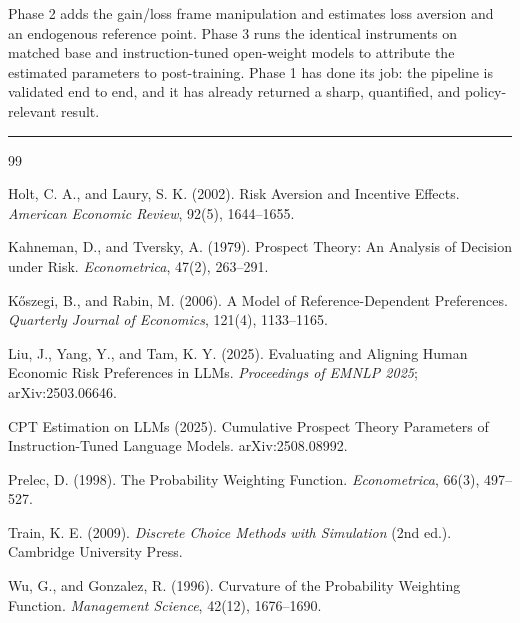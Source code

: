 \documentclass[11pt]{article}
\begin{document}
Phase 2 adds the gain/loss frame manipulation and estimates loss aversion and an endogenous reference
point. Phase 3 runs the identical instruments on matched base and instruction-tuned open-weight models
to attribute the estimated parameters to post-training. Phase 1 has done its job: the pipeline is
validated end to end, and it has already returned a sharp, quantified, and policy-relevant result.

\vspace{1em}
\hrule
\vspace{0.5em}

\begin{thebibliography}{99}
\small

Holt, C. A., and Laury, S. K. (2002).
Risk Aversion and Incentive Effects. \textit{American Economic Review}, 92(5), 1644--1655.

Kahneman, D., and Tversky, A. (1979).
Prospect Theory: An Analysis of Decision under Risk. \textit{Econometrica}, 47(2), 263--291.

K\H{o}szegi, B., and Rabin, M. (2006).
A Model of Reference-Dependent Preferences. \textit{Quarterly Journal of Economics}, 121(4), 1133--1165.

Liu, J., Yang, Y., and Tam, K. Y. (2025).
Evaluating and Aligning Human Economic Risk Preferences in LLMs.
\textit{Proceedings of EMNLP 2025}; arXiv:2503.06646.

CPT Estimation on LLMs (2025). Cumulative Prospect Theory Parameters of Instruction-Tuned Language
Models. arXiv:2508.08992.

Prelec, D. (1998).
The Probability Weighting Function. \textit{Econometrica}, 66(3), 497--527.

Train, K. E. (2009).
\textit{Discrete Choice Methods with Simulation} (2nd ed.). Cambridge University Press.

Wu, G., and Gonzalez, R. (1996).
Curvature of the Probability Weighting Function. \textit{Management Science}, 42(12), 1676--1690.

\end{thebibliography}
\end{document}
